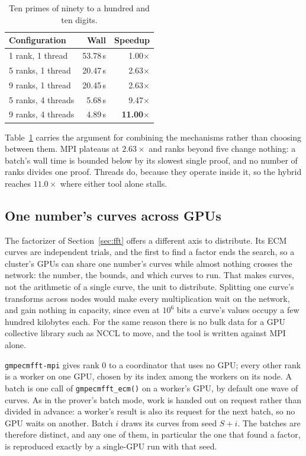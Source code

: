 \documentclass[11pt,a4paper]{article}
\newcommand{\code}[1]{\texttt{#1}}
\begin{document}
\begin{table}[t]
\centering
\begin{tabular}{lrr}
\toprule
Configuration & Wall & Speedup \\
\midrule
1 rank, 1 thread   & 53.78\,s & 1.00$\times$ \\
5 ranks, 1 thread  & 20.47\,s & 2.63$\times$ \\
9 ranks, 1 thread  & 20.45\,s & 2.63$\times$ \\
5 ranks, 4 threads &  5.68\,s & 9.47$\times$ \\
9 ranks, 4 threads &  4.89\,s & \textbf{11.00$\times$} \\
\bottomrule
\end{tabular}
\caption{Ten primes of ninety to a hundred and ten digits.}
\label{tab:mpi}
\end{table}

Table~\ref{tab:mpi} carries the argument for combining the mechanisms
rather than choosing between them. MPI plateaus at $2.63\times$ and
ranks beyond five change nothing: a batch's wall time is bounded below by
its slowest single proof, and no number of ranks divides one proof.
Threads do, because they operate inside it, so the hybrid reaches
$11.0\times$ where either tool alone stalls.

\subsection{One number's curves across GPUs}
\label{sec:fftmpi}

The factorizer of Section~\ref{sec:fft} offers a different axis to distribute. Its ECM curves
are independent trials, and the first to find a factor ends the search, so a cluster's GPUs
can share one number's curves while almost nothing crosses the network: the number, the
bounds, and which curves to run. That makes curves, not the arithmetic of a single curve, the
unit to distribute. Splitting one curve's transforms across nodes would make every
multiplication wait on the network, and gain nothing in capacity, since even at $10^6$ bits a
curve's values occupy a few hundred kilobytes each. For the same reason there is no bulk data
for a GPU collective library such as NCCL to move, and the tool is written against MPI alone.

\code{gmpecmfft-mpi} gives rank $0$ to a coordinator that uses no GPU; every other rank is a
worker on one GPU, chosen by its index among the workers on its node. A batch is one call of
\code{gmpecmfft\_ecm()} on a worker's GPU, by default one wave of curves. As in the prover's
batch mode, work is handed out on request rather than divided in advance: a worker's result
is also its request for the next batch, so no GPU waits on another. Batch $i$ draws its curves
from seed $S + i$. The batches are therefore distinct, and any one of them, in particular the
one that found a factor, is reproduced exactly by a single-GPU run with that seed.
\end{document}
